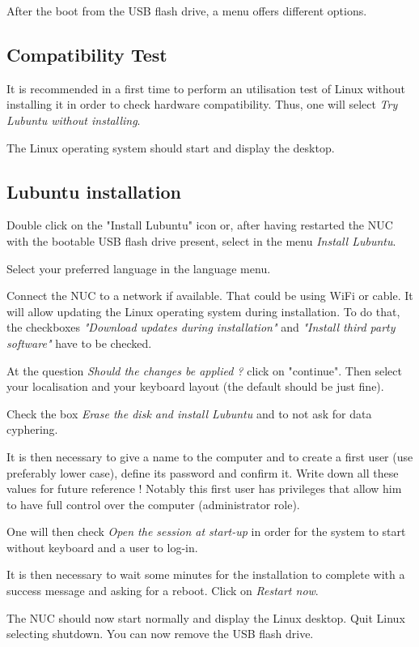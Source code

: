 \documentclass[a4paper]{ffco-rapport}
\begin{document}
After the boot from the USB flash drive, a menu offers different options.

\subsection{Compatibility Test}

	It is recommended in a first time to perform an utilisation test of Linux without installing it in order to check hardware compatibility. Thus, one will select \emph{Try Lubuntu without installing}.
	
	The Linux operating system should start and display the desktop.

\subsection{Lubuntu installation}
	Double click on the "Install Lubuntu" icon or, after having restarted the NUC with the bootable USB flash drive present, select in the menu \emph{Install Lubuntu}.

	Select your preferred language in the language menu.

	Connect the NUC to a network if available. That could be using WiFi or cable. It will allow updating the Linux operating system during installation. To do that, the checkboxes \emph{"Download updates during installation"} and \emph{"Install third party software"} have to be checked.

	At the question \emph{Should the changes be applied ?} click on "continue". Then select your localisation and your keyboard layout (the default should be just fine).

	Check the box \emph{Erase the disk and install Lubuntu} and to not ask for data cyphering.

	It is then necessary to give a name to the computer and to create a first user (use preferably lower case), define its password and confirm it. Write down all these values for future reference ! Notably this first user has privileges that allow him to have full control over the computer (administrator role).

	One will then check \emph{Open the session at start-up} in order for the system to start without keyboard and a user to log-in.

	It is then necessary to wait some minutes for the installation to complete with a success message and asking for a reboot. Click on \emph{Restart now}.

	The NUC should now start normally and display the Linux desktop. Quit Linux selecting shutdown. You can now remove the USB flash drive.
\end{document}
